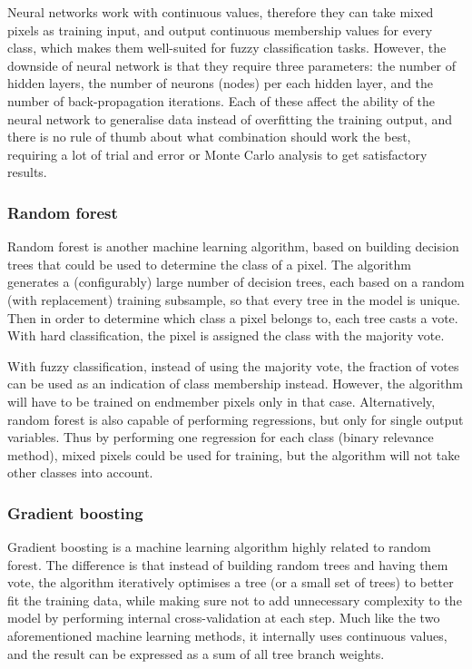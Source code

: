 \documentclass[a4paper,10pt]{article}
\begin{document}
Neural networks work with continuous values, therefore they can take mixed pixels as training input, and output continuous membership values for every class, which makes them well-suited for fuzzy classification tasks. However, the downside of neural network is that they require three parameters: the number of hidden layers, the number of neurons (nodes) per each hidden layer, and the number of back-propagation iterations. Each of these affect the ability of the neural network to generalise data instead of overfitting the training output, and there is no rule of thumb about what combination should work the best, requiring a lot of trial and error or Monte Carlo analysis to get satisfactory results.

\subsubsection{Random forest}

Random forest is another machine learning algorithm, based on building decision trees that could be used to determine the class of a pixel. The algorithm generates a (configurably) large number of decision trees, each based on a random (with replacement) training subsample, so that every tree in the model is unique. Then in order to determine which class a pixel belongs to, each tree casts a vote. With hard classification, the pixel is assigned the class with the majority vote. \cite{walton2008subpixelrf}

With fuzzy classification, instead of using the majority vote, the fraction of votes can be used as an indication of class membership instead. However, the algorithm will have to be trained on endmember pixels only in that case. Alternatively, random forest is also capable of performing regressions, but only for single output variables. Thus by performing one regression for each class (binary relevance method), mixed pixels could be used for training, but the algorithm will not take other classes into account.

\subsubsection{Gradient boosting}

Gradient boosting is a machine learning algorithm highly related to random forest. The difference is that instead of building random trees and having them vote, the algorithm iteratively optimises a tree (or a small set of trees) to better fit the training data, while making sure not to add unnecessary complexity to the model by performing internal cross-validation at each step. Much like the two aforementioned machine learning methods, it internally uses continuous values, and the result can be expressed as a sum of all tree branch weights. \cite{friedman2001gradientboost}
\end{document}
